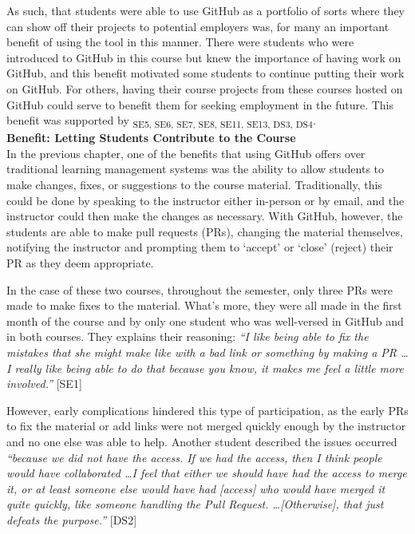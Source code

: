 
As such, that students were able to use GitHub as a portfolio of sorts where they can show off their projects to potential employers was, for many an important benefit of using the tool in this manner. There were students who were introduced to GitHub in this course but knew the importance of having work on GitHub, and this benefit motivated some students to continue putting their work on GitHub. For others, having their course projects from these courses hosted on GitHub could serve to benefit them for seeking employment in the future. This benefit was supported by \textsubscript{SE5, SE6, SE7, SE8, SE11, SE13, DS3, DS4}. \\

\textbf{Benefit: Letting Students Contribute to the Course} \\ %
In the previous chapter, one of the benefits that using GitHub offers over traditional learning management systems was the ability to allow students to make changes, fixes, or suggestions to the course material. Traditionally, this could be done by speaking to the instructor either in-person or by email, and the instructor could then make the changes as necessary. With GitHub, however, the students are able to make pull requests (PRs), changing the material themselves, notifying the instructor and prompting them to `accept' or `close' (reject) their PR as they deem appropriate.

In the case of these two courses, throughout the semester, only three PRs were made to make fixes to the material. What's more, they were all made in the first month of the course and by only one student who was well-versed in GitHub and in both courses. They explains their reasoning: \textit{``I like being able to fix the mistakes that she might make like with a bad link or something by making a PR \ldots I really like being able to do that because you know, it makes me feel a little more involved.''} [SE1]

However, early complications hindered this type of participation, as the early PRs to fix the material or add links were not merged quickly enough by the instructor and no one else was able to help. Another student described the issues occurred \textit{``because we did not have the access. If we had the access, then I think people would have collaborated \ldots I feel that either we should have had the access to merge it, or at least someone else would have had [access] who would have merged it quite quickly, like someone handling the Pull Request. \ldots [Otherwise], that just defeats the purpose.''} [DS2]

